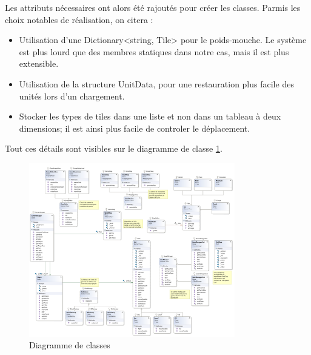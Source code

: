 Les attributs nécessaires ont alors été rajoutés pour créer les classes.
Parmis les choix notables de réalisation, on citera : 
\begin{itemize}
  \item Utilisation d'une Dictionary<string, Tile> pour le poids-mouche. Le système est plus lourd que des membres statiques dans notre cas, mais il est plus extensible.
  \item Utilisation de la structure UnitData, pour une restauration plus facile des unités lors d'un chargement.
  \item Stocker les types de tiles dans une liste et non dans un tableau à deux dimensions; il est ainsi plus facile de controler le déplacement.
\end{itemize}
Tout ces détails sont visibles sur le diagramme de classe \ref{fig:classDiagram}.
\begin{figure}[h!]
    \centering
    \includegraphics[width=0.8\textwidth]{res/Implementation.png}
    \caption{Diagramme de classes}
    \label{fig:classDiagram}
\end{figure}